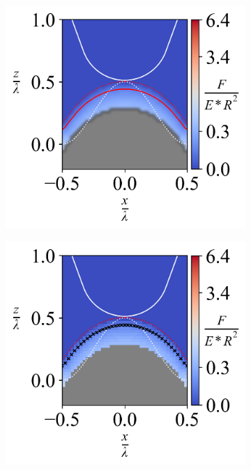 \begin{figure}[H]
    \begin{subfigure}{0.32\textwidth}
        \centering
        \caption{\label{fig: All-Wave-ContourPlot-7}}
        \includegraphics[width=1\linewidth]{Figures/Wave-ContourPlot-7.png}
    \end{subfigure}  
    \hfill  
    \begin{subfigure}{0.32\textwidth}
        \centering
        \caption{\label{fig: All-Wave-ContourPlotNI-7}}
        \includegraphics[width=1\linewidth]{Figures/Wave-ContourPlotNI-7.png}

\end{subfigure}
\end{figure}
